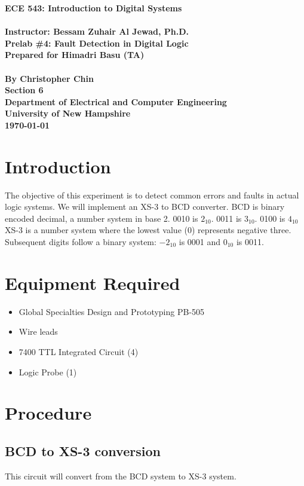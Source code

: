 \documentclass[11pt,a4paper]{article}
\begin{document}
\begin{center}
\textbf{
    \Large{ECE 543: Introduction to Digital Systems}
    \\~\\
    \large{Instructor: Bessam Zuhair Al Jewad, Ph.D.}
    \\[1.25in]
    \LARGE{Prelab \#4: Fault Detection in Digital Logic}
    \\[0.62in]
    \large{Prepared for Himadri Basu (TA)\\~\\By Christopher Chin}
    \\[1.25in]
    \LARGE{Section 6}
    \\[1.25in]
    \Large{Department of Electrical and Computer Engineering\\
           University of New Hampshire}
    \\[1.25in]
    \Large{\today}
}
\end{center}
\clearpage
{}

\tableofcontents
\pagebreak

\section{Introduction}
The objective of this experiment is to detect common errors and faults in actual logic systems.
We will implement an XS-3 to BCD converter.
BCD is binary encoded decimal, a number system in base 2.
0010 is $2_10$. 0011 is $3_10$. 0100 is $4_10$
XS-3 is a number system where the lowest value (0) represents negative three.
Subsequent digits follow a binary system: $-2_10$ is 0001 and $0_10$ is 0011.

\section{Equipment Required}
\begin{itemize}
    \item Global Specialties Design and Prototyping PB-505
    \item Wire leads
    \item 7400 TTL Integrated Circuit (4)
    \item Logic Probe (1)
\end{itemize}
\section{Procedure}
\subsection{BCD to XS-3 conversion}
This circuit will convert from the BCD system to XS-3 system.
\end{document}
